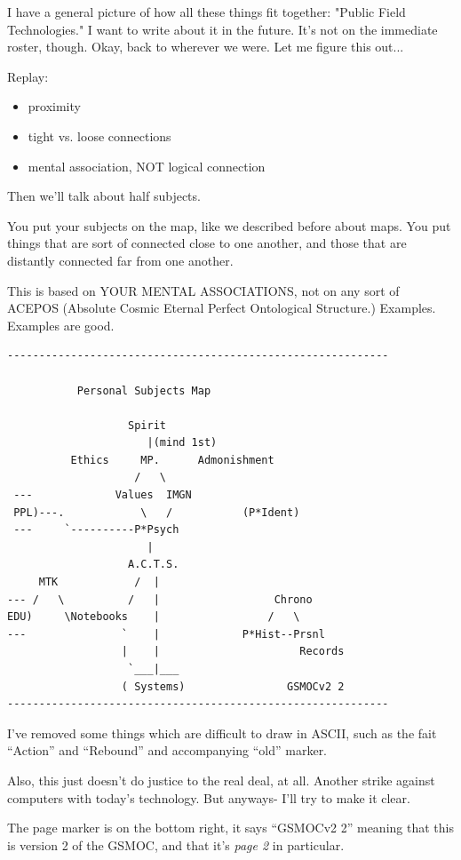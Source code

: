 \documentclass[oneside]{book}
\begin{document}
I have a general picture of how all these things fit together: "Public
Field Technologies." I want to write about it in the future. It's not
on the immediate roster, though. Okay, back to wherever we were. Let
me figure this out...

Replay:

\begin{itemize}
\item proximity
\item tight vs. loose connections
\item mental association, NOT logical connection
\end{itemize}

Then we'll talk about half subjects.

You put your subjects on the map, like we described before about
maps. You put things that are sort of connected close to one another,
and those that are distantly connected far from one another.

This is based on YOUR MENTAL ASSOCIATIONS, not on any sort of ACEPOS
(Absolute Cosmic Eternal Perfect Ontological Structure.)
Examples. Examples are good.

\begin{verbatim}
------------------------------------------------------------

           Personal Subjects Map

                   Spirit
                      |(mind 1st)
          Ethics     MP.      Admonishment
                    /   \
 ---             Values  IMGN
 PPL)---.            \   /           (P*Ident)
 ---     `----------P*Psych
                      |
                   A.C.T.S.
     MTK            /  |
--- /   \          /   |                  Chrono
EDU)     \Notebooks    |                 /   \
---               `    |             P*Hist--Prsnl
                  |    |                      Records
                   `___|___
                  ( Systems)                GSMOCv2 2
------------------------------------------------------------
\end{verbatim}

I've removed some things which are difficult to draw in ASCII, such as
the fait ``Action'' and ``Rebound'' and accompanying ``old'' marker.

Also, this just doesn't do justice to the real deal, at all. Another
strike against computers with today's technology. But anyways- I'll
try to make it clear.

The page marker is on the bottom right, it says ``GSMOCv2 2'' meaning
that this is version 2 of the GSMOC, and that it's \emph{page 2} in
particular.
\end{document}
